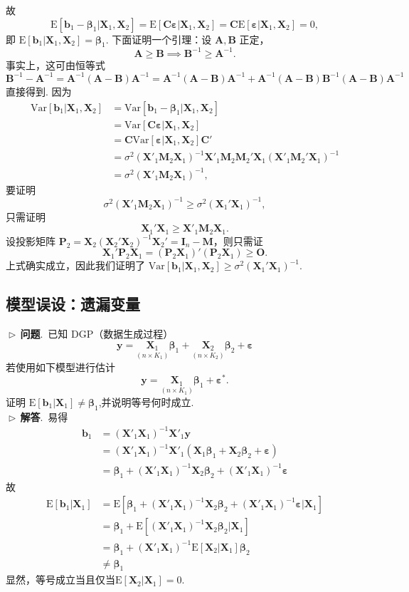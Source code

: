 \documentclass{article}
\newcommand{\E}{\mathrm{E}}
\newcommand{\Var}{\mathrm{Var}}
\newcommand{\y}{\mathbf{y}}
\newcommand{\X}{\mathbf{X}}
\newcommand{\M}{\mathbf{M}}
\newcommand{\0}{\mathbf{0}}
\newcommand{\vbe}{\bm{\beta}}
\newcommand{\vep}{\bm{\varepsilon}}
\newcommand{\vb}{\mathbf{b}}
\newcommand{\pro}{\noindent$\vartriangleright\,$\textbf{问题}.\ }
\newcommand{\sol}{\noindent$\vartriangleright\,$\textbf{解答}.\ }
\begin{document}
故
\[
\E[\vb_1-\vbe_1|\X_1,\X_2]=\E[\mathbf{C}\vep|\X_1,\X_2]=\mathbf{C}\E[\vep|\X_1,\X_2]=0,
\]
即 $\E[\vb_1|\X_1,\X_2]=\vbe_1$. 下面证明一个引理：设 $\mathbf{A},\mathbf{B}$ 正定，
\[
\mathbf{A}\ge\mathbf{B}\implies\mathbf{B}^{-1}\ge\mathbf{A}^{-1}.
\]
事实上，这可由恒等式
\[
\mathbf{B}^{-1}-\mathbf{A}^{-1} = \mathbf{A}^{-1}(\mathbf{A}-\mathbf{B})\mathbf{A}^{-1}
=\mathbf{A}^{-1}(\mathbf{A}-\mathbf{B})\mathbf{A}^{-1} + \mathbf{A}^{-1}(\mathbf{A}-\mathbf{B})\mathbf{B}^{-1}(\mathbf{A}-\mathbf{B})\mathbf{A}^{-1}
\]
直接得到. 因为
\begin{align*}
\Var[\vb_1|\X_1,\X_2]&=\Var[\vb_1-\vbe_1|\X_1,\X_2]\\
&=\Var[\mathbf{C}\vep|\X_1,\X_2]\\
&=\mathbf{C}\Var[\vep|\X_1,\X_2]\mathbf{C}'\\
&=\sigma^2(\X'_1\M_2\X_1)^{-1}\X'_1\M_2\M_2'\X_1(\X'_1\M_2'\X_1)^{-1}\\
&=\sigma^2(\X'_1\M_2\X_1)^{-1},
\end{align*}
要证明
\[
\sigma^2(\X'_1\M_2\X_1)^{-1}\ge\sigma^2(\X_1'\X_1)^{-1},
\]
只需证明
\[
\X_1'\X_1\ge\X'_1\M_2\X_1.
\]
设投影矩阵 $\mathbf{P}_2=\X_2(\X_2'\X_2)^{-1}\X_2'=\mathbf{I}_n-\M$，则只需证
\[
\X_1'\mathbf{P}_2\X_1=(\mathbf{P}_2\X_1)'(\mathbf{P}_2\X_1)\ge\mathbf{O}.
\]
上式确实成立，因此我们证明了 $\Var[\vb_1|\X_1,\X_2]\ge\sigma^2(\X_1'\X_1)^{-1}$.

\subsection{模型误设：遗漏变量}
\pro 已知 DGP（数据生成过程）
\[
\y = \underset{(n\times K_1)}{\X_1} \vbe_1 +\underset{(n\times K_2)}{\X_2} \vbe_2+\vep
\]
若使用如下模型进行估计
\[
\y = \underset{(n\times K_1)}{\X_1}\vbe_1 +\vep^*.
\]
证明 $\E[\vb_1|\X_1]\neq\vbe_1$,并说明等号何时成立.\\
\sol 易得
\begin{align*}
\vb_1&=(\X'_1\X_1)^{-1}\X'_1\y\\
&=(\X'_1\X_1)^{-1}\X'_1(\X_1\vbe_1+\X_2\vbe_2+\vep)\\
&=\vbe_1+(\X'_1\X_1)^{-1}\X_2\vbe_2+(\X'_1\X_1)^{-1}\vep
\end{align*}
故
\begin{align*}
\E[\vb_1|\X_1]&=\E[\vbe_1+(\X'_1\X_1)^{-1}\X_2\vbe_2+(\X'_1\X_1)^{-1}\vep|\X_1]\\
&=\vbe_1+\E[(\X'_1\X_1)^{-1}\X_2\vbe_2|\X_1]\\
&=\vbe_1+(\X'_1\X_1)^{-1}\E[\X_2|\X_1]\vbe_2\\
&\neq\vbe_1
\end{align*}
显然，等号成立当且仅当$\E[\X_2|\X_1]=0$.
\end{document}
